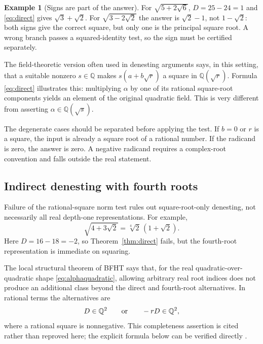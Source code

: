 \documentclass[11pt,oneside]{article}
\numberwithin{equation}{section}
\theoremstyle{definition}
\newtheorem{example}[theorem]{Example}
\theoremstyle{remark}
\newcommand{\Q}{\mathbb{Q}}
\begin{document}
\begin{example}[Signs are part of the answer]
For $\sqrt{5+2\sqrt6}$, $D=25-24=1$ and \eqref{eq:direct} gives $\sqrt3+\sqrt2$. For $\sqrt{3-2\sqrt2}$ the answer is $\sqrt2-1$, not $1-\sqrt2$: both signs give the correct square, but only one is the principal square root. A wrong branch passes a squared-identity test, so the sign must be certified separately.
\end{example}

The field-theoretic version often used in denesting arguments says, in this setting, that a suitable nonzero $s\in\Q$ makes $s(a+b\sqrt r)$ a square in $\Q(\sqrt r)$. Formula \eqref{eq:direct} illustrates this: multiplying $\alpha$ by one of its rational square-root components yields an element of the original quadratic field. This is very different from asserting $\alpha\in\Q(\sqrt s)$.

The degenerate cases should be separated before applying the test. If $b=0$ or $r$ is a square, the input is already a square root of a rational number. If the radicand is zero, the answer is zero. A negative radicand requires a complex-root convention and falls outside the real statement.

\subsection{Indirect denesting with fourth roots}\label{sec:indirect}
Failure of the rational-square norm test rules out square-root-only denesting, not necessarily all real depth-one representations. For example,
\begin{equation}\label{eq:indirectexample}
\sqrt{4+3\sqrt2}=\sqrt[4]2\,(1+\sqrt2).
\end{equation}
Here $D=16-18=-2$, so Theorem~\ref{thm:direct} fails, but the fourth-root representation is immediate on squaring.

The local structural theorem of BFHT says that, for the real quadratic-over-quadratic shape \eqref{eq:alphaquadratic}, allowing arbitrary real root indices does not produce an additional class beyond the direct and fourth-root alternatives. In rational terms the alternatives are
\begin{equation}\label{eq:indirectcriterion}
D\in\Q^2\qquad\hbox{or}\qquad -rD\in\Q^2,
\end{equation}
where a rational square is nonnegative. This completeness assertion is cited rather than reproved here; the explicit formula below can be verified directly \cite{bfht,gkioulekas}.
\end{document}
